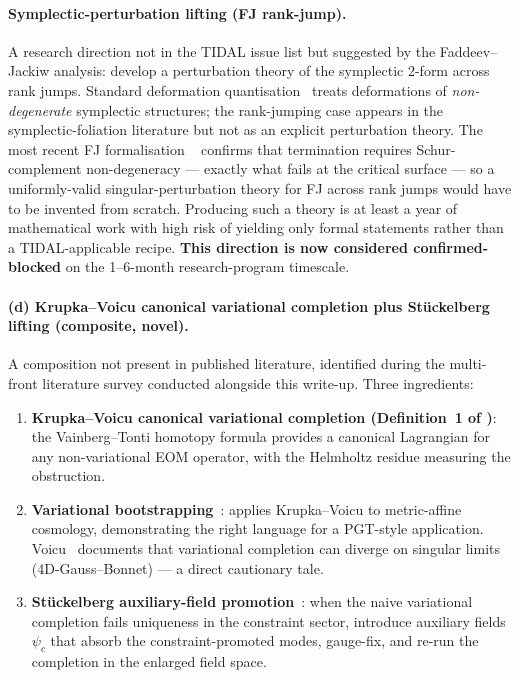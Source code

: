 \paragraph{Symplectic-perturbation lifting (FJ rank-jump).}
A research direction not in the TIDAL issue list but suggested by the
Faddeev--Jackiw analysis: develop a perturbation theory of the
symplectic 2-form across rank jumps.  Standard deformation
quantisation~\cite[for example]{HenneauxTeitelboim1992} treats
deformations of \emph{non-degenerate} symplectic structures; the
rank-jumping case appears in the symplectic-foliation literature but not
as an explicit perturbation theory.  The most recent FJ formalisation
~\cite{CaboBizetBartocci2026} confirms that termination requires
Schur-complement non-degeneracy --- exactly what fails at the critical
surface --- so a uniformly-valid singular-perturbation theory for FJ
across rank jumps would have to be invented from scratch.  Producing such
a theory is at least a year of mathematical work with high risk of
yielding only formal statements rather than a TIDAL-applicable recipe.
\textbf{This direction is now considered confirmed-blocked} on the
1--6-month research-program timescale.

\paragraph{(d) Krupka--Voicu canonical variational completion plus Stückelberg lifting (composite, novel).}
A composition not present in published literature, identified during the
multi-front literature survey conducted alongside this write-up.  Three
ingredients:
\begin{enumerate}
  \item \textbf{Krupka--Voicu canonical variational completion
    (Definition~1 of \cite{KrupkaVoicu2015})}: the Vainberg--Tonti homotopy
    formula provides a canonical Lagrangian for any non-variational EOM
    operator, with the Helmholtz residue measuring the obstruction.
  \item \textbf{Variational
    bootstrapping}~\cite{DucobuVoicu2024,DucobuVoicu2025}: applies
    Krupka--Voicu to metric-affine cosmology, demonstrating the right
    language for a PGT-style application.  Voicu~\cite{Voicu2020}
    documents that variational completion can diverge on singular
    limits (4D-Gauss--Bonnet) --- a direct cautionary tale.
  \item \textbf{Stückelberg auxiliary-field
    promotion}~\cite{Lyakhovich2021,LyakhovichSharapov2021}: when the
    naive variational completion fails uniqueness in the constraint
    sector, introduce auxiliary fields $\psi_c$ that absorb the
    constraint-promoted modes, gauge-fix, and re-run the completion in
    the enlarged field space.
\end{enumerate}

